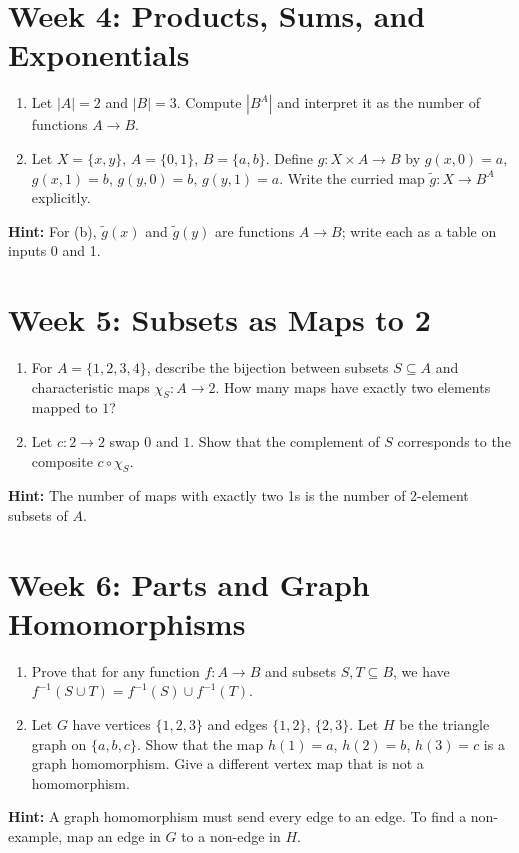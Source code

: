 \documentclass[11pt]{article}
\begin{document}
\section{Week 4: Products, Sums, and Exponentials}
\begin{enumerate}[label=(\alph*)]
  \item Let $|A|=2$ and $|B|=3$. Compute $|B^A|$ and interpret it as the number of functions $A \to B$.
  \item Let $X = \{x,y\}$, $A = \{0,1\}$, $B = \{a,b\}$. Define $g: X \times A \to B$ by
  $g(x,0)=a$, $g(x,1)=b$, $g(y,0)=b$, $g(y,1)=a$. Write the curried map $\tilde{g}: X \to B^A$ explicitly.
\end{enumerate}
\textbf{Hint:} For (b), $\tilde{g}(x)$ and $\tilde{g}(y)$ are functions $A \to B$; write each as a table on inputs 0 and 1.

\section{Week 5: Subsets as Maps to 2}
\begin{enumerate}[label=(\alph*)]
  \item For $A = \{1,2,3,4\}$, describe the bijection between subsets $S \subseteq A$ and characteristic maps $\chi_S: A \to 2$. How many maps have exactly two elements mapped to $1$?
  \item Let $c: 2 \to 2$ swap $0$ and $1$. Show that the complement of $S$ corresponds to the composite $c \circ \chi_S$.
\end{enumerate}
\textbf{Hint:} The number of maps with exactly two 1s is the number of 2-element subsets of $A$.

\section{Week 6: Parts and Graph Homomorphisms}
\begin{enumerate}[label=(\alph*)]
  \item Prove that for any function $f: A \to B$ and subsets $S,T \subseteq B$, we have $f^{-1}(S \cup T) = f^{-1}(S) \cup f^{-1}(T)$.
  \item Let $G$ have vertices $\{1,2,3\}$ and edges $\{1,2\}$, $\{2,3\}$. Let $H$ be the triangle graph on $\{a,b,c\}$. Show that the map $h(1)=a$, $h(2)=b$, $h(3)=c$ is a graph homomorphism. Give a different vertex map that is not a homomorphism.
\end{enumerate}
\textbf{Hint:} A graph homomorphism must send every edge to an edge. To find a non-example, map an edge in $G$ to a non-edge in $H$.
\end{document}
